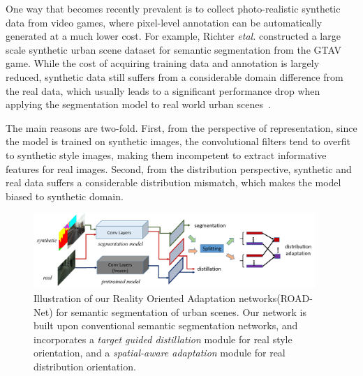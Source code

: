 \documentclass[10pt,twocolumn,letterpaper]{article}
\begin{document}
One way that becomes recently prevalent is to collect photo-realistic synthetic data from video games, where pixel-level annotation can be automatically generated at a much lower cost. For example, Richter \textit{etal.}\cite{richter2016playing} constructed a large scale synthetic urban scene dataset for semantic segmentation from the GTAV game. While the cost of acquiring training data and annotation is largely reduced, synthetic data still suffers from a considerable domain difference from the real data, which usually leads to a significant performance drop when applying the segmentation model to real world urban scenes~\cite{hoffman2016fcns,zhang2017curriculum}. 

The main reasons are two-fold. First, from the perspective of representation, since the model is trained on synthetic images, the convolutional filters tend to overfit to synthetic style images, making them incompetent to extract informative features for real images. Second, from the distribution perspective, synthetic and real data suffers a considerable distribution mismatch, which makes the model biased to synthetic domain.  

\begin{figure}
\label{fig:roadnet}
\centering
\includegraphics[width=0.95\textwidth]{roadnet.png}
\caption{Illustration of our Reality Oriented Adaptation networks(ROAD-Net) for semantic segmentation of urban scenes. Our network is built upon conventional semantic segmentation networks, and incorporates a \textit{target guided distillation} module for real style orientation, and a \textit{spatial-aware adaptation} module for real distribution orientation.}
\end{figure}
    
\end{document}
